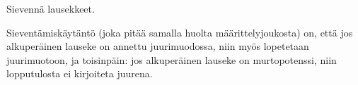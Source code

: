 \begin{esimerkki}
Sievennä lausekkeet.
	\begin{esimratk}
 	\end{esimratk}
\end{esimerkki}

Sieventämiskäytäntö (joka pitää samalla huolta määrittelyjoukosta) on, että jos alkuperäinen lauseke on annettu juurimuodossa, niin myös lopetetaan juurimuotoon, ja toisinpäin: jos alkuperäinen lauseke on murtopotenssi, niin lopputulosta ei kirjoiteta juurena.


